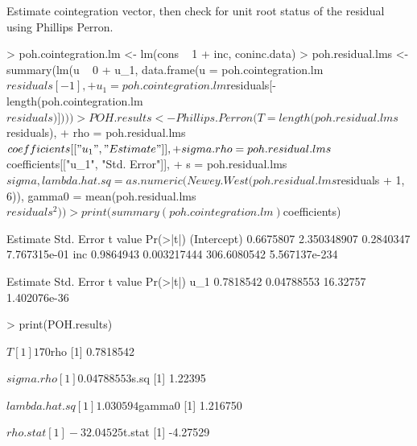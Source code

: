 Estimate cointegration vector, then check for unit root status of the residual using Phillips Perron.
\begin{Schunk}
\begin{Sinput}
> poh.cointegration.lm <- lm(cons ~ 1 + inc, coninc.data)
> poh.residual.lms <- summary(lm(u ~ 0 + u_1, data.frame(u = poh.cointegration.lm$residuals[-1], 
+     u_1 = poh.cointegration.lm$residuals[-length(poh.cointegration.lm$residuals)])))
> POH.results <- Phillips.Perron(T = length(poh.residual.lms$residuals), 
+     rho = poh.residual.lms$coefficients[["u_1", "Estimate"]], 
+     sigma.rho = poh.residual.lms$coefficients[["u_1", "Std. Error"]], 
+     s = poh.residual.lms$sigma, lambda.hat.sq = as.numeric(Newey.West(poh.residual.lms$residuals %
+         1, 6)), gamma0 = mean(poh.residual.lms$residuals^2))
> print(summary(poh.cointegration.lm)$coefficients)
\end{Sinput}
\begin{Soutput}
             Estimate  Std. Error     t value      Pr(>|t|)
(Intercept) 0.6675807 2.350348907   0.2840347  7.767315e-01
inc         0.9864943 0.003217444 306.6080542 5.567137e-234
\end{Soutput}
\begin{Soutput}
     Estimate Std. Error  t value     Pr(>|t|)
u_1 0.7818542 0.04788553 16.32757 1.402076e-36
\end{Soutput}
\begin{Sinput}
> print(POH.results)
\end{Sinput}
\begin{Soutput}
$T
[1] 170

$rho
[1] 0.7818542

$sigma.rho
[1] 0.04788553

$s.sq
[1] 1.22395

$lambda.hat.sq
[1] 1.030594

$gamma0
[1] 1.216750

$rho.stat
[1] -32.04525

$t.stat
[1] -4.27529
\end{Soutput}
\end{Schunk}
